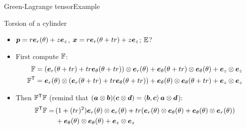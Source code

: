 \begin{frame}{Green-Lagrange tensor}{Example}
\begin{overprint}
\vskip-20pt
\begin{block}{Torsion of a cylinder}
\begin{itemize}
\item $\pv=r\ev_r(\theta)+z\ev_z$, $\xv=r\ev_r(\theta+tr)+z\ev_z$; $\GreenL$?
\item First compute $\Fp$:
{\scriptsize
\begin{displaymath}
\begin{split}
\Fp&=(\ev_r(\theta+tr)+tr\ev_\theta(\theta+tr))\otimes\ev_r(\theta)+\ev_\theta(\theta+tr)\otimes\ev_\theta(\theta)+\ev_z\otimes\ev_z \\
\Fp^\itr &=\ev_r(\theta)\otimes(\ev_r(\theta+tr)+tr\ev_\theta(\theta+tr))+\ev_\theta(\theta)\otimes\ev_\theta(\theta+tr)+\ev_z\otimes\ev_z
\end{split}
\end{displaymath}}
\item Then $\Fp^\itr\Fp$ (remind that $(\av\otimes\bv)(\cv\otimes\dv)=\scal{\bv,\cv}\av\otimes\dv$):
{\scriptsize
\begin{displaymath}
\begin{split}
\Fp^\itr\Fp= &\,(1+(tr)^2)\ev_r(\theta)\otimes\ev_r(\theta)+tr(\ev_r(\theta)\otimes\ev_\theta(\theta)+\ev_\theta(\theta)\otimes\ev_r(\theta)) \\
&\,+\ev_\theta(\theta)\otimes\ev_\theta(\theta)+\ev_z\otimes\ev_z
\end{split}
\end{displaymath}}
\end{itemize}
\end{block}


\end{overprint}
\end{frame}
